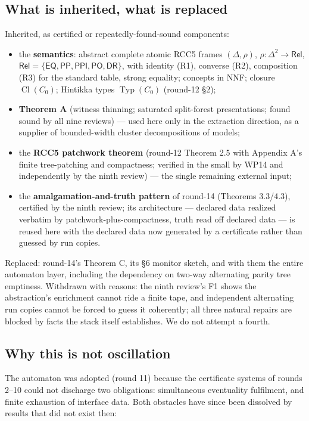 \documentclass[11pt]{article}
\theoremstyle{definition}
\newcommand{\EQ}{\mathsf{EQ}}
\newcommand{\PP}{\mathsf{PP}}
\newcommand{\PPI}{\mathsf{PPI}}
\newcommand{\PO}{\mathsf{PO}}
\newcommand{\DR}{\mathsf{DR}}
\newcommand{\Rel}{\mathsf{Rel}}
\newcommand{\Cl}{\operatorname{Cl}}
\newcommand{\Typ}{\operatorname{Typ}}
\begin{document}
\subsection{What is inherited, what is replaced}

Inherited, as certified or repeatedly-found-sound components:
\begin{itemize}[leftmargin=2em]
\item the \textbf{semantics}: abstract complete atomic RCC5 frames
$(\Delta,\rho)$, $\rho:\Delta^2\to\Rel$,
$\Rel=\{\EQ,\PP,\PPI,\PO,\DR\}$, with identity (R1), converse (R2),
composition (R3) for the standard table, strong equality; concepts in
NNF; closure $\Cl(C_0)$; Hintikka types $\Typ(C_0)$ (round-12 \S2);
\item \textbf{Theorem A} (witness thinning; saturated split-forest
presentations; found sound by all nine reviews) --- used here only in
the extraction direction, as a supplier of bounded-width cluster
decompositions of models;
\item the \textbf{RCC5 patchwork theorem} (round-12 Theorem 2.5 with
Appendix A's finite tree-patching and compactness; verified in the
small by WP14 and independently by the ninth review) --- the single
remaining external input;
\item the \textbf{amalgamation-and-truth pattern} of round-14
(Theorems 3.3/4.3), certified by the ninth review; its architecture ---
declared data realized verbatim by patchwork-plus-compactness, truth
read off declared data --- is reused here with the declared data now
generated by a certificate rather than guessed by run copies.
\end{itemize}

Replaced: round-14's Theorem C, its \S6 monitor sketch, and with them
the entire automaton layer, including the dependency on two-way
alternating parity tree emptiness.  Withdrawn with reasons: the ninth
review's F1 shows the abstraction's enrichment cannot ride a finite
tape, and independent alternating run copies cannot be forced to guess
it coherently; all three natural repairs are blocked by facts the stack
itself establishes.  We do not attempt a fourth.

\subsection{Why this is not oscillation}

The automaton was adopted (round 11) because the certificate systems of
rounds 2--10 could not discharge two obligations: simultaneous
eventuality fulfilment, and finite exhaustion of interface data.  Both
obstacles have since been dissolved by results that did not exist then:
\end{document}
